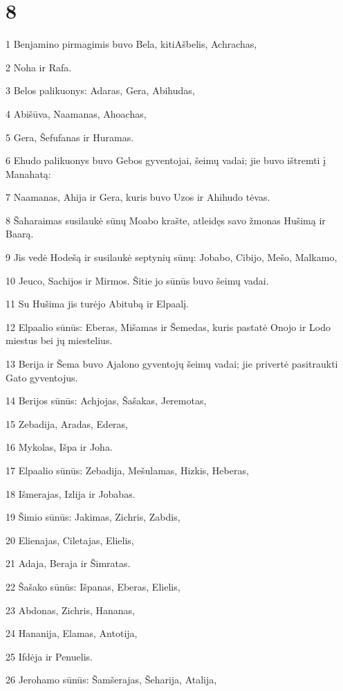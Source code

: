 \chapter{8}


\par 1 Benjamino pirmagimis buvo Bela, kiti­Ašbelis, Achrachas, 
\par 2 Noha ir Rafa. 
\par 3 Belos palikuonys: Adaras, Gera, Abihudas, 
\par 4 Abišūva, Naamanas, Ahoachas, 
\par 5 Gera, Šefufanas ir Huramas. 
\par 6 Ehudo palikuonys buvo Gebos gyventojai, šeimų vadai; jie buvo ištremti į Manahatą: 
\par 7 Naamanas, Ahija ir Gera, kuris buvo Uzos ir Ahihudo tėvas. 
\par 8 Šaharaimas susilaukė sūnų Moabo krašte, atleidęs savo žmonas Hušimą ir Baarą. 
\par 9 Jis vedė Hodešą ir susilaukė septynių sūnų: Jobabo, Cibijo, Mešo, Malkamo, 
\par 10 Jeuco, Sachijos ir Mirmos. Šitie jo sūnūs buvo šeimų vadai. 
\par 11 Su Hušima jis turėjo Abitubą ir Elpaalį. 
\par 12 Elpaalio sūnūs: Eberas, Mišamas ir Šemedas, kuris pastatė Onojo ir Lodo miestus bei jų miestelius. 
\par 13 Berija ir Šema buvo Ajalono gyventojų šeimų vadai; jie privertė pasitraukti Gato gyventojus. 
\par 14 Berijos sūnūs: Achjojas, Šašakas, Jeremotas, 
\par 15 Zebadija, Aradas, Ederas, 
\par 16 Mykolas, Išpa ir Joha. 
\par 17 Elpaalio sūnūs: Zebadija, Mešulamas, Hizkis, Heberas, 
\par 18 Išmerajas, Izlija ir Jobabas. 
\par 19 Šimio sūnūs: Jakimas, Zichris, Zabdis, 
\par 20 Elienajas, Ciletajas, Elielis, 
\par 21 Adaja, Beraja ir Šimratas. 
\par 22 Šašako sūnūs: Išpanas, Eberas, Elielis, 
\par 23 Abdonas, Zichris, Hananas, 
\par 24 Hananija, Elamas, Antotija, 
\par 25 Ifdėja ir Penuelis. 
\par 26 Jerohamo sūnūs: Šamšerajas, Šeharija, Atalija, 
